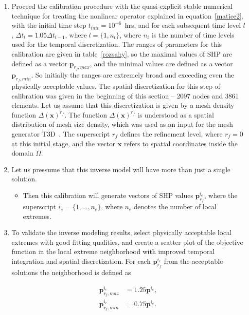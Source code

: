 \documentclass[review]{elsarticle}
\newenvironment{lineq}
    {\begin{linenomath*}
    \begin{equation}
    }
    { 
    \end{equation} 
    \end{linenomath*}
    }
\renewcommand{\vec}{\mathbf}
\begin{document}
 \begin{enumerate}[label=({\bf \roman*})]
\item Proceed the calibration procedure with the quasi-explicit stable numerical technique for treating the nonlinear operator explained in equation~\eqref{matice2}, with the initial time step $t_{init}= 10^{-6}$~hrs, and for each subsequent time level $l$, $\Delta t_l = 1.05 \Delta t_{l-1}$, where $l=\{1,n_t\}$, where $n_t$ is the number of time levels used for the temporal discretization. The ranges of parameters for this calibration are given in table~\ref{rozsahy}, so the maximal values of SHP are defined as a vector $\vec{p}_{r_f,max}$, and the minimal values are defined as a vector $\vec{p}_{r_f,min}$. So initially the ranges are extremely broad and exceeding even the physically acceptable values. The spatial discretization for this step of calibration was given in the beginning of this section -- 2097 nodes and 3861 elements. 
Let us assume that this discretization is given by a mesh density function ${\Delta}(\vec{x})^{r_f}$. The function $\Delta(\vec{x})^{r_f}$ is understood as a spatial distribution of mesh size density, which was used as an input for the mesh generator T3D~\citep{t3d}. The superscript $r_f$ defines the refinement level, where $r_f=0$ at this initial stage, and the vector $\vec{x}$ refers to spatial coordinates inside the domain $\Omega$.
\item Let us pressume that this inverse model will have more than just a single solution. \begin{itemize} \item Then this calibration will generate vectors of SHP values $\vec{p}^{i_e}_{r_f}$, where the superscript $i_e=\{1,...,n_e\}$, where $n_e$     denotes the number of  local extremes. \end{itemize} 
\item To validate the inverse modeling results, select physically acceptable local extremes with good fitting qualities, and create a scatter plot of the objective function in the local extreme  neighborhood  with improved temporal integration and spatial discretization. For each $\vec{p}^{i_e}_{r_f}$ from the acceptable solutions the neighborhood is defined as
\begin{lineq}
\begin{split}
\vec{p}^{i_e}_{r_f,max} &= 1.25\vec{p}^{i_e}, \\
\vec{p}^{i_e}_{r_f,min} &= 0.75\vec{p}^{i_e}. 
\end{split}
\end{lineq}



\end{enumerate}
\end{document}
